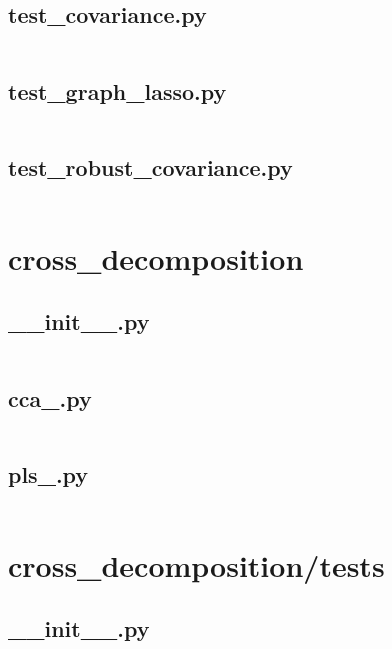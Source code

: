 \documentclass{article}
\begin{document}
\subsection{test\_covariance.py}
\inputminted{python}{/home/dufferzafar/dev/@clones/scikit-learn/sklearn/covariance/tests/test_covariance.py}
\newpage

\subsection{test\_graph\_lasso.py}
\inputminted{python}{/home/dufferzafar/dev/@clones/scikit-learn/sklearn/covariance/tests/test_graph_lasso.py}
\newpage

\subsection{test\_robust\_covariance.py}
\inputminted{python}{/home/dufferzafar/dev/@clones/scikit-learn/sklearn/covariance/tests/test_robust_covariance.py}
\newpage

\section{cross\_decomposition}

\subsection{\_\_init\_\_.py}
\inputminted{python}{/home/dufferzafar/dev/@clones/scikit-learn/sklearn/cross_decomposition/__init__.py}
\newpage

\subsection{cca\_.py}
\inputminted{python}{/home/dufferzafar/dev/@clones/scikit-learn/sklearn/cross_decomposition/cca_.py}
\newpage

\subsection{pls\_.py}
\inputminted{python}{/home/dufferzafar/dev/@clones/scikit-learn/sklearn/cross_decomposition/pls_.py}
\newpage

\section{cross\_decomposition/tests}

\subsection{\_\_init\_\_.py}
\inputminted{python}{/home/dufferzafar/dev/@clones/scikit-learn/sklearn/cross_decomposition/tests/__init__.py}
\newpage
\end{document}
